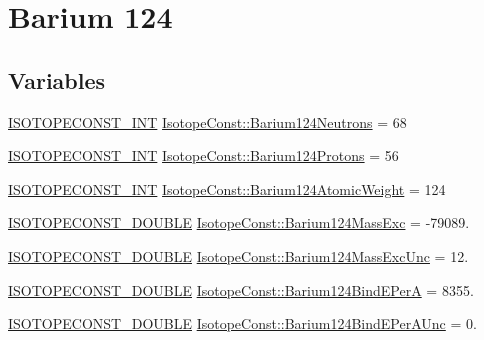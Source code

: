 \hypertarget{group___isotope_const-_barium-_ba124}{}\section{Barium 124}
\label{group___isotope_const-_barium-_ba124}
\subsection*{Variables}
\begin{DoxyCompactItemize}
\item 
\mbox{\hyperlink{group___isotope_const-_macros_ga5f18360b3e99483a35c32d789e62621c}{I\+S\+O\+T\+O\+P\+E\+C\+O\+N\+S\+T\+\_\+\+I\+NT}} \mbox{\hyperlink{group___isotope_const-_barium-_ba124_ga1b44beba9d3094413554708361569071}{Isotope\+Const\+::\+Barium124\+Neutrons}} = 68
\item 
\mbox{\hyperlink{group___isotope_const-_macros_ga5f18360b3e99483a35c32d789e62621c}{I\+S\+O\+T\+O\+P\+E\+C\+O\+N\+S\+T\+\_\+\+I\+NT}} \mbox{\hyperlink{group___isotope_const-_barium-_ba124_ga657ed4feb1f88f1699d618414d47b4c3}{Isotope\+Const\+::\+Barium124\+Protons}} = 56
\item 
\mbox{\hyperlink{group___isotope_const-_macros_ga5f18360b3e99483a35c32d789e62621c}{I\+S\+O\+T\+O\+P\+E\+C\+O\+N\+S\+T\+\_\+\+I\+NT}} \mbox{\hyperlink{group___isotope_const-_barium-_ba124_ga544b285dd0701f73f1437e92c6e81747}{Isotope\+Const\+::\+Barium124\+Atomic\+Weight}} = 124
\item 
\mbox{\hyperlink{group___isotope_const-_macros_ga8f45a7272ce02c0b4c65c44636ed719a}{I\+S\+O\+T\+O\+P\+E\+C\+O\+N\+S\+T\+\_\+\+D\+O\+U\+B\+LE}} \mbox{\hyperlink{group___isotope_const-_barium-_ba124_gafe21c575561f4b30e59171fa3d88d3aa}{Isotope\+Const\+::\+Barium124\+Mass\+Exc}} = -\/79089.
\item 
\mbox{\hyperlink{group___isotope_const-_macros_ga8f45a7272ce02c0b4c65c44636ed719a}{I\+S\+O\+T\+O\+P\+E\+C\+O\+N\+S\+T\+\_\+\+D\+O\+U\+B\+LE}} \mbox{\hyperlink{group___isotope_const-_barium-_ba124_ga93687578b10896de7e292305ac79a1c2}{Isotope\+Const\+::\+Barium124\+Mass\+Exc\+Unc}} = 12.
\item 
\mbox{\hyperlink{group___isotope_const-_macros_ga8f45a7272ce02c0b4c65c44636ed719a}{I\+S\+O\+T\+O\+P\+E\+C\+O\+N\+S\+T\+\_\+\+D\+O\+U\+B\+LE}} \mbox{\hyperlink{group___isotope_const-_barium-_ba124_gacc0934855782ef17aa26ed0fbaa00672}{Isotope\+Const\+::\+Barium124\+Bind\+E\+PerA}} = 8355.
\item 
\mbox{\hyperlink{group___isotope_const-_macros_ga8f45a7272ce02c0b4c65c44636ed719a}{I\+S\+O\+T\+O\+P\+E\+C\+O\+N\+S\+T\+\_\+\+D\+O\+U\+B\+LE}} \mbox{\hyperlink{group___isotope_const-_barium-_ba124_gaea915e8dc0076c16bc2ad5599bc9979f}{Isotope\+Const\+::\+Barium124\+Bind\+E\+Per\+A\+Unc}} = 0.

\end{DoxyCompactItemize}

